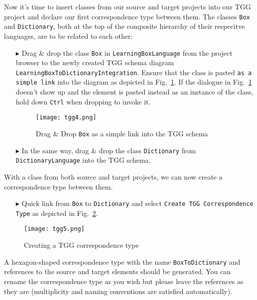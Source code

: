 Now it's time to insert classes from our source and target projects into our TGG project and declare our first correspondence type between them.
The classes \texttt{Box} and \texttt{Dictionary}, both at the top of the composite hierarchy of their respecitve languages, are to be related to each other:
\begin{enumerate}
\item[$\blacktriangleright$] Drag \& drop the class \texttt{Box} in \texttt{Learning\-Box\-Language} from the project 
browser to the newly created TGG schema diagram \texttt{Learning\-Box\-To\-Dictionary\-Integration}.
Ensure that the class is pasted \texttt{as a simple link} into the diagram as depicted in Fig.~\ref{fig:drag_drop_box}. 
If the dialogue in Fig.~\ref{fig:drag_drop_box} doesn't show up and the element is pasted instead as an instance of the class, hold down \texttt{Ctrl} when dropping to invoke it.

\begin{figure}[htbp]
\begin{center}
  \texttt{[image: tgg4.png]}
  \caption{Drag \& Drop \texttt{Box} as a simple link into the TGG schema} 
  \label{fig:drag_drop_box}
\end{center}
\end{figure}

\item[$\blacktriangleright$] In the same way, drag \& drop the class \texttt{Dictionary} from \texttt{Dictionary\-Language} into the TGG schema. 
\end{enumerate}

With a class from both source and target projects, we can now create a correspondence type between them.
\begin{enumerate}
\item[$\blacktriangleright$] Quick link from \texttt{Box} to \texttt{Dictionary} and select \texttt{Create TGG Corres\-pon\-dence Type} as depicted in Fig.~\ref{fig:create_correspondence}.
\end{enumerate}

\begin{figure}[htbp]
\begin{center}
  \texttt{[image: tgg5.png]}
  \caption{Creating a TGG correspondence type} 
  \label{fig:create_correspondence}
\end{center}
\end{figure}

A hexagon-shaped correspondence type with the name \texttt{BoxToDiction\-ary} and references to the source and target elements should be generated.
You can rename the correspondence type as you wish but please leave the references as they are (multiplicity and naming conventions are satisfied automatically).

